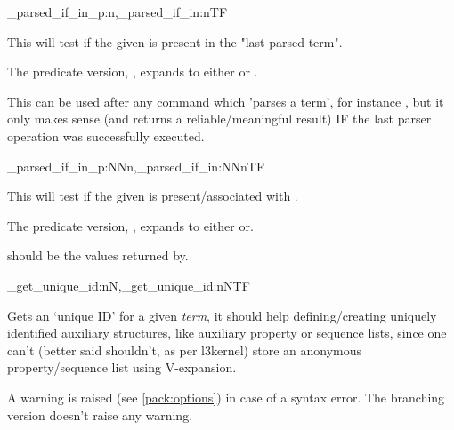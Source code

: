 \documentclass[10pt]{article}
\begin{document}
\begin{codedescribe}[code,EXP,new=2023/05/20]{\starray_parsed_if_in_p:n,\starray_parsed_if_in:nTF}
\begin{codesyntax}%
\end{codesyntax}
This will test if the given  is present in the "last parsed term". 
\end{codedescribe}
\begin{tsremark}
The predicate version, , expands to either  or \break {}.
\end{tsremark}
\begin{tsremark}
This can be used after any command which 'parses a term', for instance , but it only makes sense (and returns a reliable/meaningful result) IF the last parser operation was successfully executed.
\end{tsremark}


\begin{codedescribe}[code,EXP,new=2023/11/28]{\starray_parsed_if_in_p:NNn,\starray_parsed_if_in:NNnTF}
\begin{codesyntax}%
\end{codesyntax}
This will test if the given  is present/associated with .
\end{codedescribe}
\begin{tsremark}
The predicate version, , expands to either  or\break  {}.
\end{tsremark}
\begin{tsremark}
 should be the values returned by\break  {}.
\end{tsremark}

\begin{codedescribe}[code,new=2024/03/10]{\starray_get_unique_id:nN,\starray_get_unique_id:nNTF}
\begin{codesyntax}%
\end{codesyntax}
Gets an `unique ID' for a given  \emph{term}, it should help defining/creating uniquely identified auxiliary structures, like auxiliary property or sequence lists, since one can't (better said shouldn't, as per l3kernel) store an anonymous property/sequence list using V-expansion. 
\end{codedescribe}
\begin{tsremark}
A warning is raised (see \ref{pack:options}) in case of a  syntax error. The branching version doesn't raise any warning.
\end{tsremark}
\end{document}
